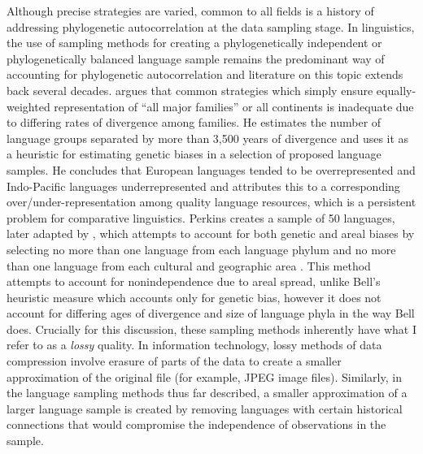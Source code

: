 Although precise strategies are varied, common to all fields is a history of addressing phylogenetic autocorrelation at the data sampling stage. In linguistics, the use of sampling methods for creating a phylogenetically independent or phylogenetically balanced language sample remains the predominant way of accounting for phylogenetic autocorrelation and literature on this topic extends back several decades. \textcite[pp.~145--149]{bell_language_1978} argues that common strategies which simply ensure equally-weighted representation of ``all major families'' or all continents is inadequate due to differing rates of divergence among families. He estimates the number of language groups separated by more than 3,500 years of divergence and uses it as a heuristic for estimating genetic biases in a selection of proposed language samples. He concludes that European languages tended to be overrepresented and Indo-Pacific languages underrepresented and attributes this to a corresponding over/under-representation among quality language resources, which is a persistent problem for comparative linguistics. Perkins \autocites*{perkins_evolution_1980}{perkins_covariation_1988} creates a sample of 50 languages, later adapted by \textcite{bybee_morphology_1985}, which attempts to account for both genetic and areal biases by selecting no more than one language from each language phylum \autocite[following][]{voegelin_index_1966} and no more than one language from each cultural and geographic area \autocites[following][]{kenny_numerical_1975}{murdock_ethnographic_1967}. This method attempts to account for nonindependence due to areal spread, unlike Bell's heuristic measure which accounts only for genetic bias, however it does not account for differing ages of divergence and size of language phyla in the way Bell does. Crucially for this discussion, these sampling methods inherently have what I refer to as a \emph{lossy} quality. In information technology, lossy methods of data compression involve erasure of parts of the data to create a smaller approximation of the original file (for example, JPEG image files). Similarly, in the language sampling methods thus far described, a smaller approximation of a larger language sample is created by removing languages with certain historical connections that would compromise the independence of observations in the sample.

